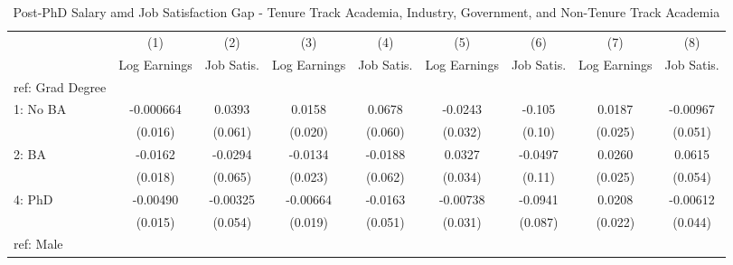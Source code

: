 \begin{table}[htbp]\centering
\def\sym#1{\ifmmode^{#1}\else\(^{#1}\)\fi}
\caption{Post-PhD Salary amd Job Satisfaction Gap - Tenure Track Academia, Industry, Government, and Non-Tenure Track Academia \label{tab1}}
\begin{tabular}{l*{8}{c}}
\hline\hline
  &\multicolumn{1}{c}{(1)}&\multicolumn{1}{c}{(2)}&\multicolumn{1}{c}{(3)}&\multicolumn{1}{c}{(4)}&\multicolumn{1}{c}{(5)}&\multicolumn{1}{c}{(6)}&\multicolumn{1}{c}{(7)}&\multicolumn{1}{c}{(8)}\\
  &\multicolumn{1}{c}{Log Earnings}&\multicolumn{1}{c}{Job Satis.}&\multicolumn{1}{c}{Log Earnings}&\multicolumn{1}{c}{Job Satis.}&\multicolumn{1}{c}{Log Earnings}&\multicolumn{1}{c}{Job Satis.}&\multicolumn{1}{c}{Log Earnings}&\multicolumn{1}{c}{Job Satis.}\\
\hline
ref: Grad Degree&                     &                     &                     &                     &                     &                     &                     &                     \\
[1em]
1: No BA&   -0.000664         &      0.0393         &      0.0158         &      0.0678         &     -0.0243         &      -0.105         &      0.0187         &    -0.00967         \\
  &     (0.016)         &     (0.061)         &     (0.020)         &     (0.060)         &     (0.032)         &      (0.10)         &     (0.025)         &     (0.051)         \\
[1em]
2: BA&     -0.0162         &     -0.0294         &     -0.0134         &     -0.0188         &      0.0327         &     -0.0497         &      0.0260         &      0.0615         \\
  &     (0.018)         &     (0.065)         &     (0.023)         &     (0.062)         &     (0.034)         &      (0.11)         &     (0.025)         &     (0.054)         \\
[1em]
4: PhD&    -0.00490         &    -0.00325         &    -0.00664         &     -0.0163         &    -0.00738         &     -0.0941         &      0.0208         &    -0.00612         \\
  &     (0.015)         &     (0.054)         &     (0.019)         &     (0.051)         &     (0.031)         &     (0.087)         &     (0.022)         &     (0.044)         \\
[1em]
ref: Male&                     &                     &                     &                     &                     &                     &                     &                     \\

\end{tabular}
\end{table}
